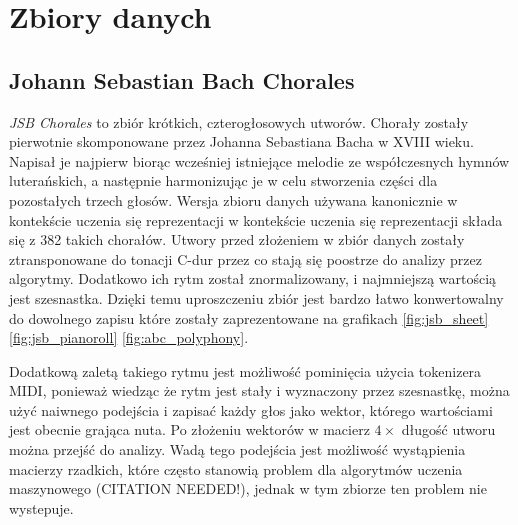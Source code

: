 \documentclass[data-science]{agh-wi} %
\begin{document}
\section{Zbiory danych}

\subsection{Johann Sebastian Bach Chorales}
\textit{JSB Chorales} \cite{bachchorales} to zbiór krótkich, czterogłosowych utworów. Chorały zostały pierwotnie skomponowane przez Johanna Sebastiana Bacha w XVIII wieku. Napisał je najpierw biorąc wcześniej istniejące melodie ze współczesnych hymnów luterańskich, a następnie harmonizując je w celu stworzenia części dla pozostałych trzech głosów. Wersja zbioru danych używana kanonicznie w kontekście uczenia się reprezentacji w kontekście uczenia się reprezentacji składa się z 382 takich chorałów. Utwory przed złożeniem w zbiór danych zostały ztransponowane do tonacji C-dur przez co stają się poostrze do analizy przez algorytmy. Dodatkowo ich rytm został znormalizowany, i najmniejszą wartością jest szesnastka. Dzięki temu uproszczeniu zbiór jest bardzo łatwo konwertowalny do dowolnego zapisu które zostały zaprezentowane na grafikach \ref*{fig:jsb_sheet} \ref*{fig:jsb_pianoroll} \ref*{fig:abc_polyphony}.

Dodatkową zaletą takiego rytmu jest możliwość pominięcia użycia tokenizera MIDI, ponieważ wiedząc że rytm jest stały i wyznaczony przez szesnastkę, można użyć naiwnego podejścia i zapisać każdy głos jako wektor, którego wartościami jest obecnie grająca nuta. Po złożeniu wektorów w macierz $4\times$ długość utworu można przejść do analizy. Wadą tego podejścia jest możliwość wystąpienia macierzy rzadkich, które często stanowią problem dla algorytmów uczenia maszynowego (CITATION NEEDED!), jednak w tym zbiorze ten problem nie wystepuje.
\end{document}
